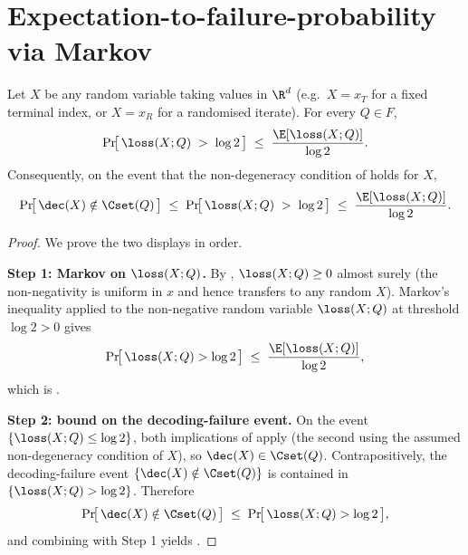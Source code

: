 \section{Expectation-to-failure-probability via Markov}
\label{sec:expectation_to_failure}

\begin{lemma}\label{lem:expectation_to_failure}
Let $X$ be any random variable taking values in $\R^d$ (e.g.\
$X = x_T$ for a fixed terminal index, or $X = x_R$ for a randomised
iterate). For every $Q \in F$,
\begin{align}\label{eq:markov_loss_tail}
   \Pr\!\bigl[\, \loss(X; Q) \;>\; \log 2 \,\bigr]
   \;\le\;
   \frac{\E[\loss(X; Q)]}{\log 2}.
\end{align}
Consequently, on the event that the non-degeneracy condition
 of 
holds for $X$,
\begin{align}\label{eq:markov_decoding_failure}
   \Pr\!\bigl[\, \dec(X) \notin \Cset(Q) \,\bigr]
   \;\le\;
   \Pr\!\bigl[\, \loss(X; Q) \;>\; \log 2 \,\bigr]
   \;\le\;
   \frac{\E[\loss(X; Q)]}{\log 2}.
\end{align}
\end{lemma}


\begin{proof}
We prove the two displays in order.

\noindent\textbf{Step 1: Markov on $\loss(X; Q)$.}
By , $\loss(X; Q) \ge 0$ almost surely (the
non-negativity is uniform in $x$ and hence transfers to any random $X$).
Markov's inequality applied to the non-negative random variable
$\loss(X; Q)$ at threshold $\log 2 > 0$ gives
\begin{align*}
   \Pr\!\bigl[\, \loss(X; Q) > \log 2 \,\bigr]
   \;\le\;
   \frac{\E[\loss(X; Q)]}{\log 2},
\end{align*}
which is .

\noindent\textbf{Step 2: bound on the decoding-failure event.}
On the event $\{\loss(X; Q) \le \log 2\}$, both implications of
 apply (the second using the assumed
non-degeneracy condition \Cref{eq:logit_margin_nondegen} of
$X$), so $\dec(X) \in \Cset(Q)$. Contrapositively, the decoding-failure
event $\{\dec(X) \notin \Cset(Q)\}$ is contained in
$\{\loss(X; Q) > \log 2\}$. Therefore
\begin{align*}
   \Pr\!\bigl[\, \dec(X) \notin \Cset(Q) \,\bigr]
   \;\le\;
   \Pr\!\bigl[\, \loss(X; Q) > \log 2 \,\bigr],
\end{align*}
and combining with Step 1 yields .
\end{proof}

